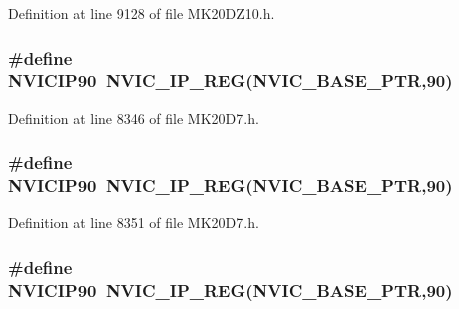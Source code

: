 Definition at line 9128 of file M\+K20\+D\+Z10.\+h.

\subsubsection[{\texorpdfstring{N\+V\+I\+C\+I\+P90}{NVICIP90}}]{\setlength{\rightskip}{0pt plus 5cm}\#define N\+V\+I\+C\+I\+P90~{\bf N\+V\+I\+C\+\_\+\+I\+P\+\_\+\+R\+EG}({\bf N\+V\+I\+C\+\_\+\+B\+A\+S\+E\+\_\+\+P\+TR},90)}\hypertarget{group___n_v_i_c___register___accessor___macros_gac0417d7f27002ee75d89b29e2c3b182d}{}\label{group___n_v_i_c___register___accessor___macros_gac0417d7f27002ee75d89b29e2c3b182d}


Definition at line 8346 of file M\+K20\+D7.\+h.

\subsubsection[{\texorpdfstring{N\+V\+I\+C\+I\+P90}{NVICIP90}}]{\setlength{\rightskip}{0pt plus 5cm}\#define N\+V\+I\+C\+I\+P90~{\bf N\+V\+I\+C\+\_\+\+I\+P\+\_\+\+R\+EG}({\bf N\+V\+I\+C\+\_\+\+B\+A\+S\+E\+\_\+\+P\+TR},90)}\hypertarget{group___n_v_i_c___register___accessor___macros_gac0417d7f27002ee75d89b29e2c3b182d}{}\label{group___n_v_i_c___register___accessor___macros_gac0417d7f27002ee75d89b29e2c3b182d}


Definition at line 8351 of file M\+K20\+D7.\+h.

\subsubsection[{\texorpdfstring{N\+V\+I\+C\+I\+P90}{NVICIP90}}]{\setlength{\rightskip}{0pt plus 5cm}\#define N\+V\+I\+C\+I\+P90~{\bf N\+V\+I\+C\+\_\+\+I\+P\+\_\+\+R\+EG}({\bf N\+V\+I\+C\+\_\+\+B\+A\+S\+E\+\_\+\+P\+TR},90)}\hypertarget{group___n_v_i_c___register___accessor___macros_gac0417d7f27002ee75d89b29e2c3b182d}{}\label{group___n_v_i_c___register___accessor___macros_gac0417d7f27002ee75d89b29e2c3b182d}


